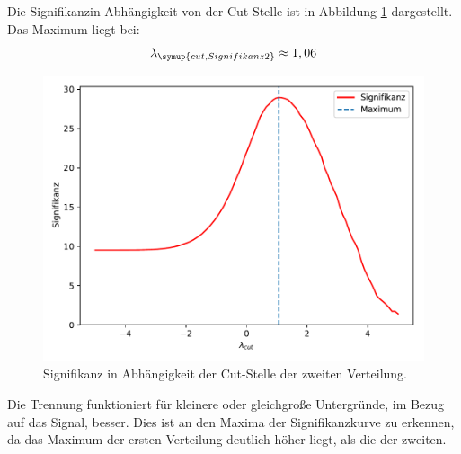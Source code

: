 Die Signifikanzin Abhängigkeit von der Cut-Stelle ist in Abbildung \ref{abb:8} dargestellt.
Das Maximum liegt bei:
\begin{equation*}
  \lambda_{\symup{cut,Signifikanz2}} \approx 1,06
\end{equation*}
\begin{figure}
  \centering
  \includegraphics[scale=0.7]{Aufgabe12/Signifikanz2.pdf}
  \caption{Signifikanz in Abhängigkeit der Cut-Stelle der zweiten Verteilung.}
  \label{abb:8}
\end{figure}

Die Trennung funktioniert für kleinere oder gleichgroße Untergründe, im Bezug auf
das Signal, besser. Dies ist an den Maxima der Signifikanzkurve zu erkennen, da
das Maximum der ersten Verteilung deutlich höher liegt, als die der zweiten.

